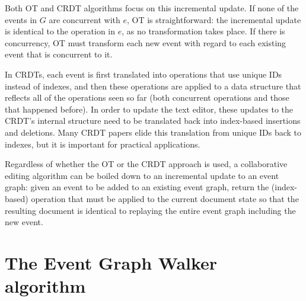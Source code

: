 \documentclass[sigplan,10pt]{acmart}
\begin{document}
Both OT and CRDT algorithms focus on this incremental update.
If none of the events in $G$ are concurrent with $e$, OT is straightforward: the incremental update is identical to the operation in $e$, as no transformation takes place.
If there is concurrency, OT must transform each new event with regard to each existing event that is concurrent to it.

In CRDTs, each event is first translated into operations that use unique IDs instead of indexes, and then these operations are applied to a data structure that reflects all of the operations seen so far (both concurrent operations and those that happened before).
In order to update the text editor, these updates to the CRDT's internal structure need to be translated back into index-based insertions and deletions.
Many CRDT papers elide this translation from unique IDs back to indexes, but it is important for practical applications. %



Regardless of whether the OT or the CRDT approach is used, a collaborative editing algorithm can be boiled down to an incremental update to an event graph: given an event to be added to an existing event graph, return the (index-based) operation that must be applied to the current document state so that the resulting document is identical to replaying the entire event graph including the new event.


\section{The Event Graph Walker algorithm}\label{algorithm}
\end{document}
